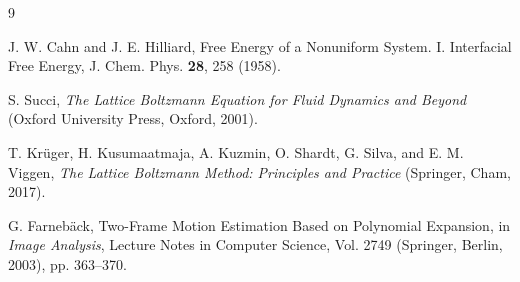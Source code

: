 \documentclass[aps,pre,twocolumn,showpacs,superscriptaddress,floatfix]{revtex4-2}
\begin{document}
\begin{thebibliography}{9}

J. W. Cahn and J. E. Hilliard, Free Energy of a Nonuniform System. I. Interfacial Free Energy, J. Chem. Phys. \textbf{28}, 258 (1958).

S. Succi, \textit{The Lattice Boltzmann Equation for Fluid Dynamics and Beyond} (Oxford University Press, Oxford, 2001).

T. Kr\"uger, H. Kusumaatmaja, A. Kuzmin, O. Shardt, G. Silva, and E. M. Viggen, \textit{The Lattice Boltzmann Method: Principles and Practice} (Springer, Cham, 2017).

G. Farneb\"ack, Two-Frame Motion Estimation Based on Polynomial Expansion, in \textit{Image Analysis}, Lecture Notes in Computer Science, Vol. 2749 (Springer, Berlin, 2003), pp. 363--370.

\end{thebibliography}
\end{document}
